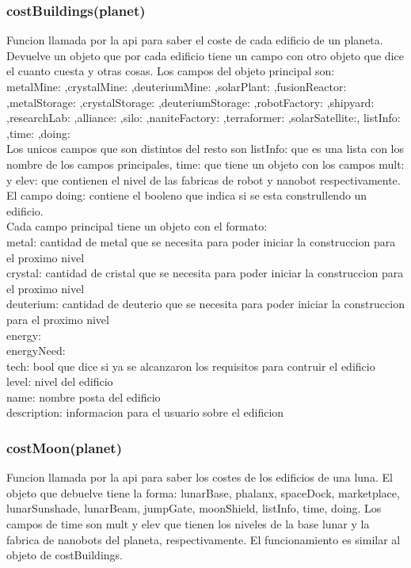\documentclass{article}
\newcommand\tab[1][1cm]{\hspace*{#1}}
\begin{document}
        \subsubsection{costBuildings(planet)}
          Funcion llamada por la api para saber el coste de cada edificio de un planeta. Devuelve un objeto que por cada edificio tiene un campo con otro objeto que dice el cuanto cuesta y otras cosas. Los campos del objeto principal son:\\
          metalMine: ,crystalMine: ,deuteriumMine: ,solarPlant: ,fusionReactor: ,metalStorage: ,crystalStorage: ,deuteriumStorage: ,robotFactory: ,shipyard: ,researchLab: ,alliance: ,silo: ,naniteFactory: ,terraformer: ,solarSatellite:, listInfo: ,time: ,doing:\\
          Los unicos campos que son distintos del resto son listInfo: que es una lista con los nombre de los campos principales, time: que tiene un objeto con los campos mult: y elev: que contienen el nivel de las fabricas de robot y nanobot respectivamente. El campo doing: contiene el booleno que indica si se esta construllendo un edificio.\\
          Cada campo principal tiene un objeto con el formato:\\
          \tab metal: cantidad de metal que se necesita para poder iniciar la construccion para el proximo nivel\\
          \tab crystal: cantidad de cristal que se necesita para poder iniciar la construccion para el proximo nivel\\
          \tab deuterium: cantidad de deuterio que se necesita para poder iniciar la construccion para el proximo nivel\\
          \tab energy: \\
          \tab energyNeed: \\
          \tab tech: bool que dice si ya se alcanzaron los requisitos para contruir el edificio\\
          \tab level: nivel del edificio\\
          \tab name: nombre posta del edificio\\
          \tab description: informacion para el usuario sobre el edificion\\
        \subsubsection{costMoon(planet)}
            Funcion llamada por la api para saber los costes de los edificios de una luna. El objeto que debuelve tiene la forma: lunarBase, phalanx, spaceDock, marketplace, lunarSunshade, lunarBeam, jumpGate, moonShield, listInfo, time, doing. Los campos de time son mult y elev que tienen los niveles de la base lunar y la fabrica de nanobots del planeta, respectivamente. El funcionamiento es similar al objeto de costBuildings.
\end{document}
